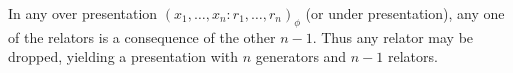 In any over presentation $(x_1, \ldots, x_n : r_1, \ldots, r_n)_\phi$ (or under presentation), any one of the relators is a consequence of the other $n-1$. Thus any relator may be dropped, yielding a presentation with $n$ generators and $n-1$ relators.
